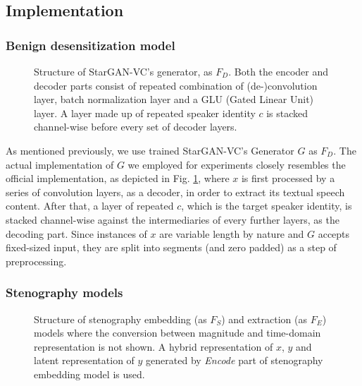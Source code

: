\documentclass[conference]{IEEEtran}
\begin{document}
\subsection{Implementation}

\subsubsection{Benign desensitization model}

\begin{figure}[!t]
    \caption{Structure of StarGAN-VC's generator, as $F_D$. Both the encoder and decoder parts consist of repeated combination of (de-)convolution layer, batch normalization layer and a GLU (Gated Linear Unit) layer. A layer made up of repeated speaker identity $c$ is stacked channel-wise before every set of decoder layers.}
    \label{fig:sgvc_impl}
\end{figure}

As mentioned previously, we use trained StarGAN-VC's Generator $G$ as $F_D$. The actual implementation of $G$ we employed for experiments closely resembles the official implementation, as depicted in Fig. \ref{fig:sgvc_impl}, where $x$ is first processed by a series of convolution layers, as a decoder, in order to extract its textual speech content. After that, a layer of repeated $c$, which is the target speaker identity, is stacked channel-wise against the intermediaries of every further layers, as the decoding part. Since instances of $x$ are variable length by nature and $G$ accepts fixed-sized input, they are split into segments (and zero padded) as a step of preprocessing.

\subsubsection{Stenography models}

\begin{figure}[!t]
    \caption{Structure of stenography embedding (as $F_S$) and extraction (as $F_E$) models where the conversion between magnitude and time-domain representation is not shown. A hybrid representation of $x$, $y$ and latent representation of $y$ generated by \textit{Encode} part of stenography embedding model is used.}
    \label{fig:steno_impl}
\end{figure}
\end{document}
